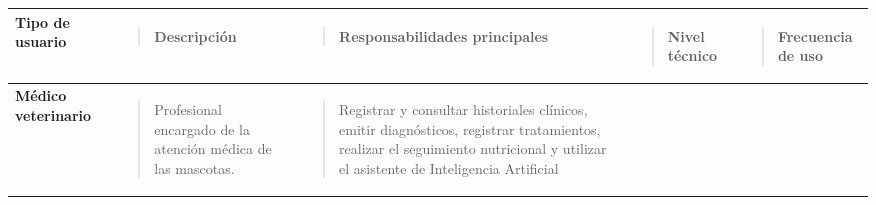 \documentclass[
]{article}
\newcounter{none} %
\begin{document}
{\def\LTcaptype{none} %
\begin{longtable}[]{@{}
  >{\raggedright\arraybackslash}p{}
  >{\raggedright\arraybackslash}p{}
  >{\raggedright\arraybackslash}p{}
  >{\raggedright\arraybackslash}p{}
  >{\raggedright\arraybackslash}p{}@{}}
\toprule\noalign{}
\begin{minipage}[b]{\linewidth}\centering
\textbf{Tipo de usuario}
\end{minipage} & \begin{minipage}[b]{\linewidth}\raggedright
\begin{quote}
\textbf{Descripción}
\end{quote}
\end{minipage} & \begin{minipage}[b]{\linewidth}\raggedright
\begin{quote}
\textbf{Responsabilidades principales}
\end{quote}
\end{minipage} & \begin{minipage}[b]{\linewidth}\raggedright
\begin{quote}
\textbf{Nivel técnico}
\end{quote}
\end{minipage} & \begin{minipage}[b]{\linewidth}\raggedright
\begin{quote}
\textbf{Frecuencia de uso}
\end{quote}
\end{minipage} \\
\midrule\noalign{}
\endhead
\bottomrule\noalign{}
\endlastfoot
\textbf{Médico veterinario} &
\begin{minipage}[t]{\linewidth}\raggedright
\begin{quote}
Profesional encargado de la atención médica de las mascotas.
\end{quote}
\end{minipage} & \begin{minipage}[t]{\linewidth}\raggedright
\begin{quote}
Registrar y consultar historiales clínicos, emitir diagnósticos,
registrar tratamientos, realizar el seguimiento nutricional y utilizar
el asistente de Inteligencia Artificial


\end{quote}
\end{minipage}
\end{longtable}}
\end{document}
